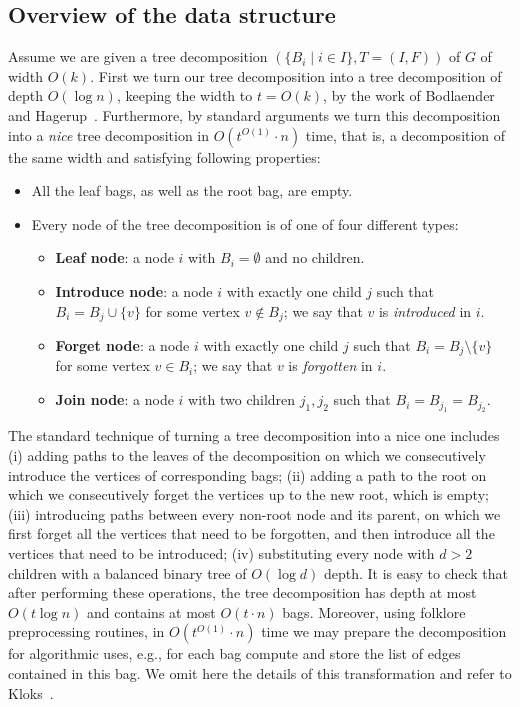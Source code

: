 \documentclass[a4paper,11pt]{article}
\theoremstyle{definition}
\theoremstyle{remark}
\begin{document}
\subsection{Overview of the data structure}
Assume we are given a tree decomposition $(\{B_i \mid i \in I\},
T=(I,F))$ of $G$ of width $O(k)$. First we turn our tree decomposition
into a tree decomposition of depth $O(\log n)$, keeping the width to
$t = O(k)$, by the work of Bodlaender and
Hagerup~\cite{BodlaenderH98}.  Furthermore, by standard arguments we
turn this decomposition into a {\emph{nice}} tree decomposition in
$O(t^{O(1)}\cdot n)$ time, that is, a decomposition of the same width
and satisfying following properties:
\begin{itemize}
\item All the leaf bags, as well as the root bag, are empty.
\item Every node of the tree decomposition is of one of four different
  types:
  \begin{itemize}
  \item {\bf{Leaf node}}: a node $i$ with $B_i=\emptyset$ and no children.
  \item {\bf{Introduce node}}: a node $i$ with exactly one child $j$
    such that $B_i=B_j\cup\{v\}$ for some vertex $v\notin B_j$; we say
    that $v$ is {\emph{introduced}} in $i$.
  \item {\bf{Forget node}}: a node $i$ with exactly one child $j$ such
    that $B_i=B_j\setminus \{v\}$ for some vertex $v\in B_i$; we say
    that $v$ is {\emph{forgotten}} in $i$.
  \item {\bf{Join node}}: a node $i$ with two children $j_1,j_2$ such
    that $B_i=B_{j_1}=B_{j_2}$.
  \end{itemize}
\end{itemize}
The standard technique of turning a tree decomposition into a nice one
includes (i) adding paths to the leaves of the decomposition on which
we consecutively introduce the vertices of corresponding bags; (ii)
adding a path to the root on which we consecutively forget the
vertices up to the new root, which is empty; (iii) introducing paths
between every non-root node and its parent, on which we first forget
all the vertices that need to be forgotten, and then introduce all the
vertices that need to be introduced; (iv) substituting every node with
$d>2$ children with a balanced binary tree of $O(\log d)$ depth.  It
is easy to check that after performing these operations, the tree
decomposition has depth at most $O(t\log n)$ and contains at most
$O(t\cdot n)$ bags. Moreover, using folklore preprocessing routines,
in $O(t^{O(1)}\cdot n)$ time we may prepare the decomposition for
algorithmic uses, e.g., for each bag compute and store the list of
edges contained in this bag.  We omit here the details of this
transformation and refer to Kloks~\cite{Kloks93}.
\end{document}
